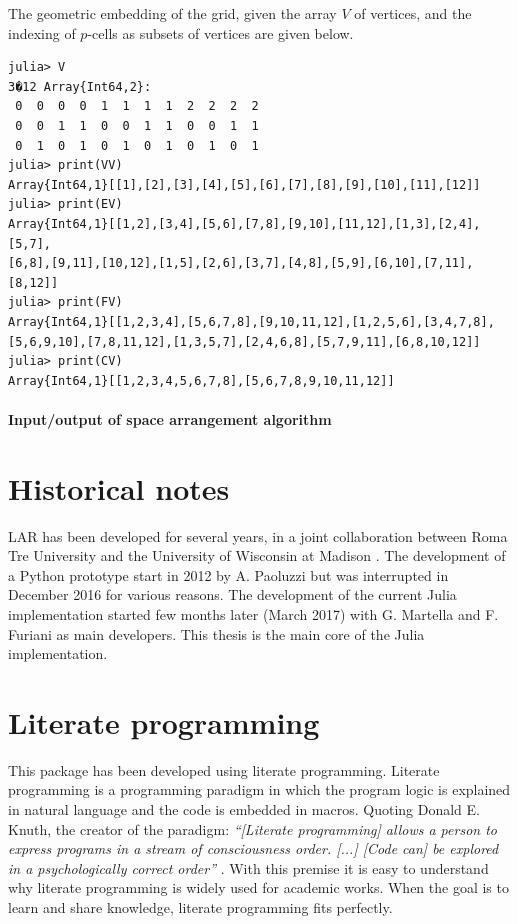 The geometric embedding of the grid, given the array $V$ of vertices, and the indexing of $p$-cells as subsets of vertices are given below.

{\small\begin{verbatim}
julia> V
3�12 Array{Int64,2}:
 0  0  0  0  1  1  1  1  2  2  2  2
 0  0  1  1  0  0  1  1  0  0  1  1
 0  1  0  1  0  1  0  1  0  1  0  1
julia> print(VV)
Array{Int64,1}[[1],[2],[3],[4],[5],[6],[7],[8],[9],[10],[11],[12]]
julia> print(EV)
Array{Int64,1}[[1,2],[3,4],[5,6],[7,8],[9,10],[11,12],[1,3],[2,4],[5,7],
[6,8],[9,11],[10,12],[1,5],[2,6],[3,7],[4,8],[5,9],[6,10],[7,11],[8,12]]
julia> print(FV)
Array{Int64,1}[[1,2,3,4],[5,6,7,8],[9,10,11,12],[1,2,5,6],[3,4,7,8],
[5,6,9,10],[7,8,11,12],[1,3,5,7],[2,4,6,8],[5,7,9,11],[6,8,10,12]]
julia> print(CV)
Array{Int64,1}[[1,2,3,4,5,6,7,8],[5,6,7,8,9,10,11,12]]
\end{verbatim}
}


\paragraph{Input/output of space arrangement algorithm}



\section{Historical notes}
\label{sec:history}
LAR has been developed for several years, in a joint collaboration 
between Roma Tre University and the University 
of Wisconsin at Madison \cite{ieee-tase}. The development of a Python 
prototype start in 2012 by A. Paoluzzi but was interrupted 
in December 2016 for various reasons. The development of the current
Julia implementation started few months later (March 2017) with
G. Martella and F. Furiani as main developers. This thesis is
the main core of the Julia implementation.


\section{Literate programming}
This package has been developed using literate programming.
Literate programming is a programming paradigm in which the program
logic is explained in natural language and the code is embedded in macros.
Quoting Donald E. Knuth, the creator of the paradigm: 
\textit{``[Literate programming] allows a person to express programs in a stream of
consciousness order. [...] [Code can] be explored
in a psychologically correct order''} \cite{knuth}. 
With this premise it is easy to understand why literate programming 
is widely used for academic works.
When the goal is to learn and share knowledge, literate programming fits perfectly.


